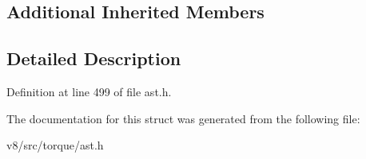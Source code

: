 \subsection*{Additional Inherited Members}


\subsection{Detailed Description}


Definition at line 499 of file ast.\+h.



The documentation for this struct was generated from the following file\+:\begin{DoxyCompactItemize}
\item 
v8/src/torque/ast.\+h\end{DoxyCompactItemize}
